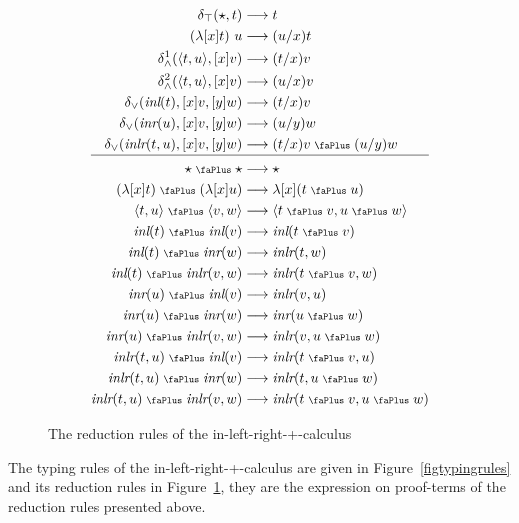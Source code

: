 \documentclass[screen, sigconf,authorversion,nonacm]{acmart}
\theoremstyle{acmdefinition}
\numberwithin{equation}{section}
\newcommand\abstr[1]{[#1]}
\newcommand\inl{\mbox{\it inl}}
\newcommand\inr{\mbox{\it inr}}
\newcommand\inlr{\mbox{\it inlr}}
\newcommand\elimtop{\delta_{\top}}
\newcommand\elimand{\delta_{\wedge}}
\newcommand\elimor{\delta_{\vee}}
\newcommand\plus{\mathrel{\text{\normalfont\scalebox{0.7}{\faPlus}}}}
\newcommand\pair[2]{\langle #1, #2 \rangle}
\begin{document}
\begin{figure}[t]
  \begin{align}
    \elimtop(\star, t) & \longrightarrow t
    \label{ruelimtop}\\
    (\lambda \abstr{x}t)~u & \longrightarrow  (u/x)t
    \label{rubeta}\\
    \elimand^1(\pair{t}{u}, \abstr{x}v) & \longrightarrow  (t/x)v
    \label{ruelimand1}\\
    \elimand^2(\pair{t}{u}, \abstr{x}v) & \longrightarrow  (u/x)v
    \label{ruelimand2}\\
    \elimor(\inl(t),\abstr{x}v,\abstr{y}w) & \longrightarrow  (t/x)v
    \label{ruelimorinl}\\
    \elimor(\inr(u),\abstr{x}v,\abstr{y}w) & \longrightarrow (u/y)w
    \label{ruelimorinr}\\
    \elimor(\inlr(t,u),\abstr{x}v,\abstr{y}w) & \longrightarrow  (t/x)v \plus (u/y)w 
    \label{ruelimorinlr1}\\[1pt]\hline \nonumber\\[-11pt]
    \star \plus \star&\longrightarrow  \star 
    \label{rusumstar}\\
    (\lambda \abstr{x}t) \plus (\lambda \abstr{x}u) & \longrightarrow  \lambda \abstr{x}(t \plus u)
    \label{rusumlam}\\
    \pair{t}{u} \plus \pair{v}{w} & \longrightarrow  \pair{t \plus v}{u \plus w}
    \label{rusumpair}\\
    \inl(t) \plus \inl(v) & \longrightarrow  \inl(t \plus v)
    \label{rusuminl}\\
    \inl(t) \plus \inr(w) & \longrightarrow  \inlr(t,w) 
    \label{rusuminlinr} \\
    \inl(t) \plus \inlr(v,w) & \longrightarrow  \inlr(t \plus v,w) 
    \label{rusuminlinlr}\\
    \inr(u) \plus \inl(v) & \longrightarrow  \inlr(v,u) 
    \label{rusuminrinl}\\
    \inr(u) \plus \inr(w) & \longrightarrow  \inr(u \plus w) 
    \label{rusuminr}\\
    \inr(u) \plus \inlr(v,w) & \longrightarrow  \inlr(v,u \plus w) 
    \label{rusuminrinlr}\\
    \inlr(t,u) \plus \inl(v) & \longrightarrow  \inlr(t \plus v,u) 
    \label{rusuminlrinl}\\
    \inlr(t,u) \plus \inr(w) & \longrightarrow  \inlr(t,u \plus w) 
    \label{rusuminlrinr}\\
    \inlr(t,u) \plus \inlr(v,w) & \longrightarrow  \inlr(t \plus v,u \plus w) 
    \label{rusuminlr}
\end{align}
  \caption{The reduction rules of the in-left-right-+-calculus\label{figureductionrules}}
\end{figure}
The typing rules of the in-left-right-+-calculus are given in
Figure~\ref{figtypingrules} and its reduction rules in
Figure~\ref{figureductionrules}, they are the expression on
proof-terms of the reduction rules presented above.
\end{document}
